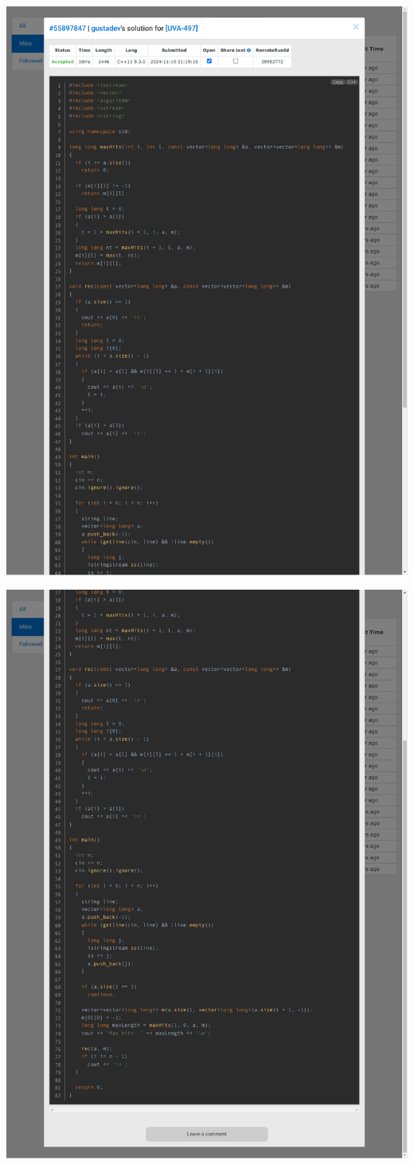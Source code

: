 \documentclass[a4paper, 12pt]{article}
\begin{document}
\includegraphics[clip, trim=40 0 40 25, width=17cm]{497/submit-1.pdf}\vspace{-2cm}

\includegraphics[clip, trim=40 0 40 25, width=17cm]{497/submit-2.pdf}\vspace{-2cm}
\end{document}
